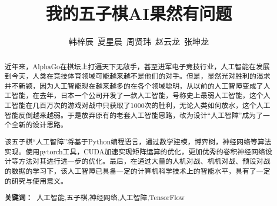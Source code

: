 \documentclass[a4paper]{article}
\title{\heiti \Large 我的五子棋AI果然有问题}%
\author{\songti \small 韩梓辰\ 夏星晨\ 周贤玮\ 赵云龙\ 张坤龙}%
\renewcommand{\headrulewidth}{0.4pt}
\begin{document}
\maketitle %
\thispagestyle{fancy} %
\lhead{\textcolor{gray} {计算机科学}}
\rhead{\textcolor{gray} {DOI:xxxxxx}}
\renewcommand{\headrulewidth}{0.4pt}
\begin{abstract}
  近年来，AlphaGo在棋坛上打遍天下无敌手，甚至进军电子竞技行业，人工智能在发展到今天，人类在竞技体育领域可能越来越不是他们的对手。但是，显然光对胜利的渴求并不新颖，因为人工智能现在越来越多的在各个领域聪明，从以前的人工智障变成了人工智能，在去年，日本一个公司开发了一款人工智能，号称史上最弱人工智能，这个人工智能在几百万次的游戏对战中只获取了1000次的胜利，无论人类如何放水，这个人工智能反倒越来越弱。于是放弃原有的老套人工智能思路，改为设计“人工智障”成为了一个全新的设计思路。\par
该五子棋“人工智障”将基于Python编程语言，通过数学建模，博弈树，神经网络等算法实现。使用pytorch工具，CUDA加速实现矩阵运算的优化，更加优秀的卷积神经网络设计等方法对其进行进一步的优化。最后，在通过大量的人机对战、机机对战、预设对战的数据的学习下，该人工智障已具备一定的计算机科学技术上的智能水平，具有了一定的研究与使用意义。
  \par\textbf{关键词：\ }人工智能,五子棋,神经网络,人工智障,TensorFlow
\end{abstract}
\setlength{\baselineskip}{20pt}
\tableofcontents  %
\newpage
\end{document}
